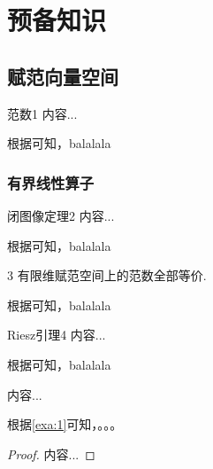 \chapter{ 预备知识}
\section{赋范向量空间} 

\begin{mydef}{范数}{1}
	内容...
\end{mydef}

根据可知，balalala


\subsection{有界线性算子}

\begin{mythm}{闭图像定理}{2}
	内容...
\end{mythm}

根据可知，balalala

\begin{myprop}{}{3}
	有限维赋范空间上的范数全部等价.
\end{myprop}

根据可知，balalala


\begin{mylem}{Riesz引理}{4}
	内容...
\end{mylem}

根据可知，balalala

\begin{example}[$L^{p}(\Omega)$]
	\label{exa:1}
	内容...
\end{example}

根据\ref{exa:1}可知，。。。

\begin{proof}
	内容...
\end{proof}

